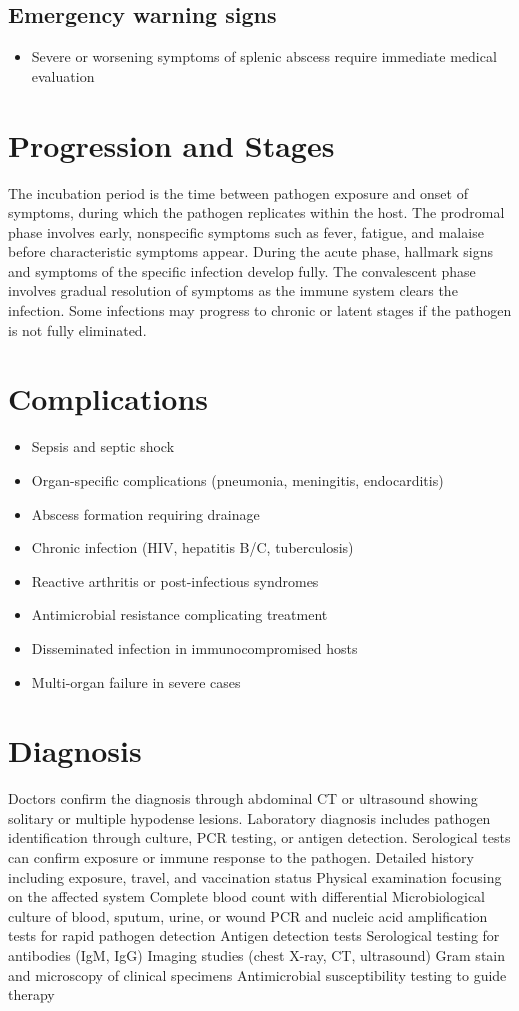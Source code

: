\subsection{Emergency warning signs}
\begin{itemize}[noitemsep]
  \item Severe or worsening symptoms of splenic abscess require immediate medical evaluation
\end{itemize}
\section{Progression and Stages}
The incubation period is the time between pathogen exposure and onset of symptoms, during which the pathogen replicates within the host. The prodromal phase involves early, nonspecific symptoms such as fever, fatigue, and malaise before characteristic symptoms appear. During the acute phase, hallmark signs and symptoms of the specific infection develop fully. The convalescent phase involves gradual resolution of symptoms as the immune system clears the infection. Some infections may progress to chronic or latent stages if the pathogen is not fully eliminated.
\section{Complications}
\begin{itemize}[noitemsep]
  \item Sepsis and septic shock
  \item Organ-specific complications (pneumonia, meningitis, endocarditis)
  \item Abscess formation requiring drainage
  \item Chronic infection (HIV, hepatitis B/C, tuberculosis)
  \item Reactive arthritis or post-infectious syndromes
  \item Antimicrobial resistance complicating treatment
  \item Disseminated infection in immunocompromised hosts
  \item Multi-organ failure in severe cases
\end{itemize}
\section{Diagnosis}
Doctors confirm the diagnosis through abdominal CT or ultrasound showing solitary or multiple hypodense lesions. Laboratory diagnosis includes pathogen identification through culture, PCR testing, or antigen detection. Serological tests can confirm exposure or immune response to the pathogen. Detailed history including exposure, travel, and vaccination status Physical examination focusing on the affected system Complete blood count with differential Microbiological culture of blood, sputum, urine, or wound PCR and nucleic acid amplification tests for rapid pathogen detection Antigen detection tests Serological testing for antibodies (IgM, IgG) Imaging studies (chest X-ray, CT, ultrasound) Gram stain and microscopy of clinical specimens Antimicrobial susceptibility testing to guide therapy

